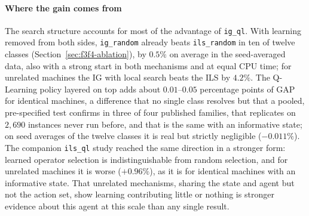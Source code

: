 \documentclass[final,3p,times,11pt,authoryear]{elsarticle}
\begin{document}
\paragraph{Where the gain comes from}
The search structure accounts for most of the advantage of \texttt{ig\_ql}. With
learning removed from both sides, \texttt{ig\_random} already beats
\texttt{ils\_random} in ten of twelve classes (Section~\ref{sec:f3f4-ablation}),
by $0.5\%$ on average in the seed-averaged data, also with a strong start in both
mechanisms and at equal CPU time; for unrelated machines the IG with local search
beats the ILS by $4.2\%$. The Q-Learning policy layered on top adds about
$0.01$--$0.05$ percentage points of GAP for identical machines, a difference that no
single class resolves but that a pooled, pre-specified test confirms in three of four
published families, that replicates on $2{,}690$ instances never run before, and that
is the same with an informative state; on seed averages of the twelve classes it is
real but strictly negligible ($-0.011\%$). The companion \texttt{ils\_ql} study
reached the same direction in a stronger form: learned operator selection is
indistinguishable from random selection, and for unrelated machines it is worse
($+0.96\%$), as it is for identical machines with an informative state. That
unrelated mechanisms, sharing the state and agent but not the action set, show
learning contributing little or nothing is stronger evidence about this agent at
this scale than any single result.
\end{document}
